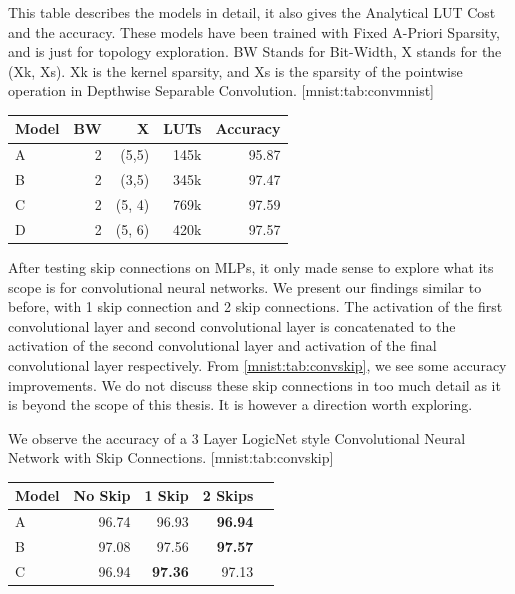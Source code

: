 \begin{table}
    \begin{sidecaption}{%
        This table describes the models in detail, it also gives the Analytical LUT Cost and the accuracy. These models have been trained with Fixed A-Priori Sparsity, and is just for topology exploration. BW Stands for Bit-Width, X stands for the (Xk, Xs). Xk is the kernel sparsity, and Xs is the sparsity of the pointwise operation in Depthwise Separable Convolution.
    }[mnist:tab:convmnist]
\begin{threeparttable}
\begin{tabular}{lrrrr}
\hline
Model & BW & X      & LUTs & Accuracy \\ \hline
A     & 2  & (5,5)  & 145k & 95.87    \\
B     & 2  & (3,5)  & 345k & 97.47    \\
C     & 2  & (5, 4) & 769k & 97.59    \\
D     & 2  & (5, 6) & 420k & 97.57    \\ \hline
\end{tabular}
\end{threeparttable}
\end{sidecaption}
\end{table}


After testing skip connections on MLPs, it only made sense to explore what its scope is for convolutional neural networks. We present our findings similar to before, with 1 skip connection and 2 skip connections. The activation of the first convolutional layer and second convolutional layer is concatenated to the activation of the second convolutional layer and activation of the final convolutional layer respectively. 
From \cref{mnist:tab:convskip}, we see some accuracy improvements. We do not discuss these skip connections in too much detail as it is beyond the scope of this thesis. It is however a direction worth exploring. 

\begin{table}[h]
    \begin{sidecaption}{%
        We observe the accuracy of a 3 Layer LogicNet style Convolutional Neural Network with Skip Connections. 
    }[mnist:tab:convskip]
\begin{threeparttable}
\begin{tabular}{lrrrr}
\hline
Model & No Skip & 1 Skip & 2 Skips            \\ \hline
A     & 96.74 & 96.93  & \textbf{96.94 }    \\
B     & 97.08 & 97.56  & \textbf{97.57}     \\
C     & 96.94 & \textbf{97.36}  & 97.13      \\  \hline 
    \end{tabular}
\end{threeparttable}
\end{sidecaption}
\end{table}

